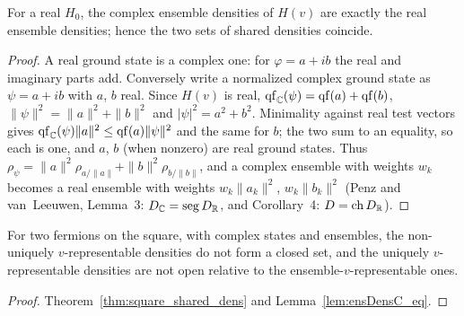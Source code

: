 \begin{lemma}
  \label{lem:ensDensC_eq}
  \leanok
  For a real $H_0$, the complex ensemble densities of $H(v)$ are exactly the real ensemble densities; hence the two
  sets of shared densities coincide.
\end{lemma}
\begin{proof}
  \leanok
  A real ground state is a complex one: for $\varphi=a+ib$ the real and imaginary parts add. Conversely write a
  normalized complex ground state as $\psi=a+ib$ with $a$, $b$ real. Since $H(v)$ is real,
  $\operatorname{qf}_{\mathbb{C}}(\psi)=\operatorname{qf}(a)+\operatorname{qf}(b)$, $\|\psi\|^2=\|a\|^2+\|b\|^2$ and $|\psi|^2=a^2+b^2$. Minimality against real test
  vectors gives $\operatorname{qf}_{\mathbb{C}}(\psi)\|a\|^2\le\operatorname{qf}(a)\|\psi\|^2$ and the same for $b$; the two sum to an equality, so each is
  one, and $a$, $b$ (when nonzero) are real ground states. Thus
  $\rho_\psi=\|a\|^2\rho_{a/\|a\|}+\|b\|^2\rho_{b/\|b\|}$, and a complex ensemble with weights $w_k$ becomes a real
  ensemble with weights $w_k\|a_k\|^2$, $w_k\|b_k\|^2$ (Penz and van~Leeuwen, Lemma~3: $D_{\mathbb{C}}=\mathrm{seg}\,D_{\mathbb{R}}$, and Corollary~4: $D=\mathrm{ch}\,D_{\mathbb{R}}$).
\end{proof}

\begin{theorem}
  \label{thm:square_shared_dens_complex}
  \leanok
  For two fermions on the square, with complex states and ensembles, the non-uniquely $v$-representable densities do
  not form a closed set, and the uniquely $v$-representable densities are not open relative to the
  ensemble-$v$-representable ones.
\end{theorem}
\begin{proof}
  \leanok
  Theorem~\ref{thm:square_shared_dens} and Lemma~\ref{lem:ensDensC_eq}.
\end{proof}
